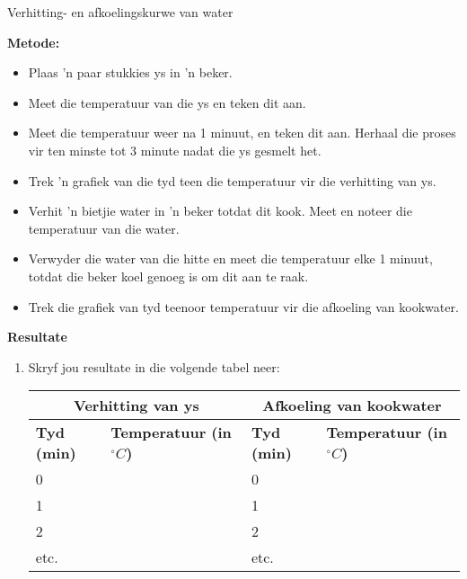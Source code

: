\begin{f_experiment}{Verhitting- en afkoelingskurwe van water}
{\label{m38736*eip-862}\noindent{}\textbf{Metode:}
\label{m38736*id9872}\begin{itemize}[noitemsep]
            \item Plaas 'n paar stukkies ys in 'n beker.
\item Meet die temperatuur van die ys en teken dit aan.
\item Meet die temperatuur weer na 1 minuut, en teken dit aan. Herhaal die proses vir ten minste tot 3 minute nadat die ys gesmelt het.
\item Trek 'n grafiek van die tyd teen die temperatuur vir die verhitting van ys. 
\item Verhit 'n bietjie water in 'n beker totdat dit kook. Meet en noteer die temperatuur van die water.
\item Verwyder die water van die hitte en meet die temperatuur elke 1 minuut, totdat die beker koel genoeg is om dit aan te raak.
\item Trek die grafiek van tyd teenoor temperatuur vir die afkoeling van kookwater. 
\end{itemize}
\label{m38736*eip-282}
	\par 
      \label{m38736*eip-863}\noindent{}\textbf{Resultate} \\
\begin{enumerate}[noitemsep, label=\textbf{\arabic*}.]
\item Skryf jou resultate in die volgende tabel neer: \\
          \begin{table}[H]
        \begin{center}
      \label{m38736*uid434}
    \noindent
      \begin{tabular}{|l|l|l|l|}\hline
\multicolumn{2}{|c|}{Verhitting van ys} & \multicolumn{2}{|c|}{Afkoeling van kookwater}  \\ \hline
 \textbf{Tyd (min)} & \textbf{Temperatuur (in $^{\circ} C$)} &  \textbf{Tyd (min)} & \textbf{Temperatuur (in $^{\circ} C$)} \\ \hline
     0    & & 0    & \\ \hline 
     1    & & 1    & \\ \hline
     2    & & 2    & \\ \hline
     etc. & & etc. & \\ \hline

\end{tabular}
\end{center}
\end{table}
\end{enumerate}}
\end{f_experiment}
